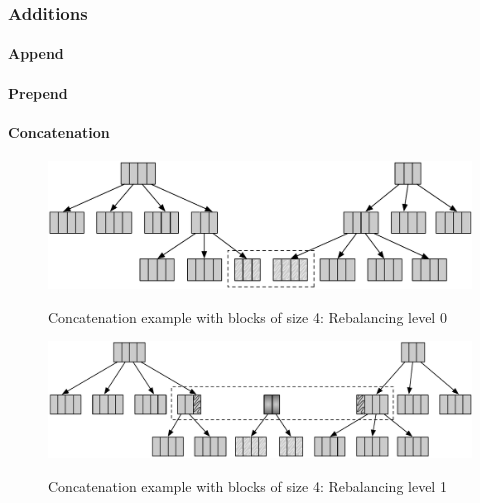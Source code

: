 
\subsubsection{Additions}

\paragraph{Append}

\paragraph{Prepend}


\paragraph{Concatenation}

\begin{figure}[h!]
  \centering
  \includegraphics[width=\textwidth]{Figures/Concat0.pdf}
  \label{Concat0Benchmarks}
  \caption{Concatenation example with blocks of size 4: Rebalancing level 0}
\end{figure}

\begin{figure}[h!]
  \centering
  \includegraphics[width=\textwidth]{Figures/Concat1.pdf}
  \label{Concat1Benchmarks}
  \caption{Concatenation example with blocks of size 4: Rebalancing level 1}
\end{figure}

